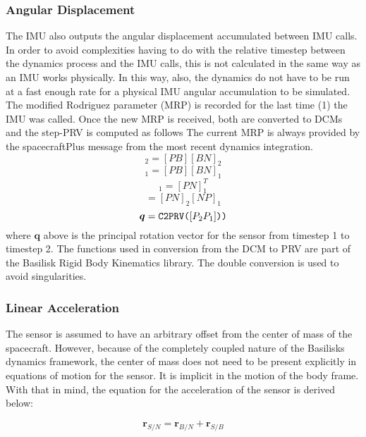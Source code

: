 \subsubsection{Angular Displacement}
The IMU also outputs the angular displacement accumulated between IMU calls. In order to avoid complexities having to do with the relative timestep between the dynamics process and the IMU calls, this is not calculated in the same way as an IMU works physically. In this way, also, the dynamics do not have to be run at a fast enough rate for a physical IMU angular accumulation to be simulated. 
The modified Rodriguez parameter (MRP) is recorded for the last time (1) the IMU was called. Once the new MRP is received, both are converted to DCMs and the step-PRV is computed as follows The current MRP is always provided by the spacecraftPlus message from the most recent dynamics integration.
\begin{equation}
	[PN]_2 = [PB][BN]_2
\end{equation}
\begin{equation}
	[PN]_1 = [PB][BN]_1
\end{equation}
\begin{equation}
	[NP]_1 = [PN]_1^T
\end{equation}
\begin{equation}
	[P_2P_1] = [PN]_2[NP]_1
\end{equation}
\begin{equation}
\bm{q} = \verb|C2PRV(|[P_2P_1]\verb|))|
\end{equation}
where $\bm{q}$ above is the principal rotation vector for the sensor from timestep 1 to timestep 2. The functions used in conversion from the DCM to PRV are part of the Basilisk Rigid Body Kinematics library. The double conversion is used to avoid singularities.

\subsubsection{Linear Acceleration}
The sensor is assumed to have an arbitrary offset from the center of mass of the spacecraft. However, because of the completely coupled nature of the Basilisks dynamics framework, the center of mass does not need to be present explicitly in equations of motion for the sensor. It is implicit in the motion of the body frame. With that in mind, the equation for the acceleration of the sensor is derived below:

\begin{equation}
\bm{r}_{S/N} = \bm{r}_{B/N} + \bm{r}_{S/B}
\end{equation}

